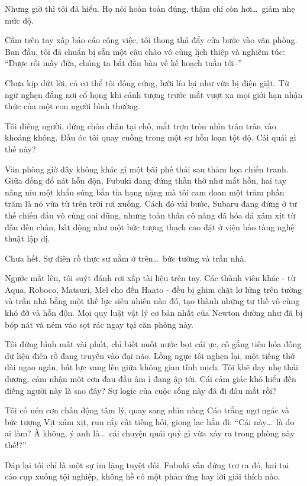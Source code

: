 \documentclass[../main.tex]{subfiles}
\begin{document}
Nhưng giờ thì tôi đã hiểu. Họ nói hoàn toàn đúng, thậm chí còn hơi\dots\ giảm nhẹ mức độ.

Cầm trên tay xấp báo cáo công việc, tôi thong thả đẩy cửa bước vào văn phòng. Ban đầu, tôi đã chuẩn bị sẵn một câu chào vô cùng lịch thiệp và nghiêm túc: ``Được rồi mấy đứa, chúng ta bắt đầu bàn về kế hoạch tuần tới--''

Chưa kịp dứt lời, cả cơ thể tôi đông cứng, lưỡi líu lại như vừa bị điện giật. Từ ngữ nghẹn đắng nơi cổ họng khi cảnh tượng trước mắt vượt xa mọi giới hạn nhận thức của một con người bình thường.

Tôi điếng người, đứng chôn chân tại chỗ, mắt trợn tròn nhìn trân trân vào khoảng không. Đầu óc tôi quay cuồng trong một sự hỗn loạn tột độ. Cái quái gì thế này?

Văn phòng giờ đây không khác gì một bãi phế thải sau thảm họa chiến tranh. Giữa đống đổ nát hỗn độn, Fubuki đang đứng thẫn thờ như mất hồn, hai tay nâng niu một khẩu súng bắn tỉa hạng nặng mà tôi cam đoan một trăm phần trăm là nó vừa từ trên trời rơi xuống. Cách đó vài bước, Subaru đang đứng ở tư thế chiến đấu vô cùng oai dũng, nhưng toàn thân cô nàng đã hóa đá xám xịt từ đầu đến chân, bất động như một bức tượng thạch cao đặt ở viện bảo tàng nghệ thuật lập dị.

Chưa hết. Sự điên rồ thực sự nằm ở trên\dots\ bức tường và trần nhà.

Ngước mắt lên, tôi suýt đánh rơi xấp tài liệu trên tay. Các thành viên khác - từ Aqua, Roboco, Matsuri, Mel cho đến Haato - đều bị ghim chặt lơ lửng trên tường và trần nhà bằng một thế lực siêu nhiên nào đó, tạo thành những tư thế vô cùng khó đỡ và hỗn độn. Mọi quy luật vật lý cơ bản nhất của Newton dường như đã bị bóp nát và ném vào sọt rác ngay tại căn phòng này.

Tôi đứng hình mất vài phút, chỉ biết nuốt nước bọt cái ực, cố gắng tiêu hóa đống dữ liệu điên rồ đang truyền vào đại não. Lồng ngực tôi nghẹn lại, một tiếng thở dài ngao ngán, bất lực vang lên giữa không gian tĩnh mịch. Tôi khẽ day nhẹ thái dương, cảm nhận một cơn đau đầu âm ỉ đang ập tới. Cái cảm giác khó hiểu đến điếng người này là sao đây? Sự logic của cuộc sống này đã đi đâu mất rồi?

Tôi cố nén cơn chấn động tâm lý, quay sang nhìn nàng Cáo trắng ngơ ngác và bức tượng Vịt xám xịt, run rẩy cất tiếng hỏi, giọng lạc hẳn đi: ``Cái này\dots\ là do ai làm? À không, ý anh là\dots\ cái chuyện quái quỷ gì vừa xảy ra trong phòng này thế!?''

Đáp lại tôi chỉ là một sự im lặng tuyệt đối. Fubuki vẫn đứng trơ ra đó, hai tai cáo cụp xuống tội nghiệp, không hề có một phản ứng hay lời giải thích nào.
\end{document}
